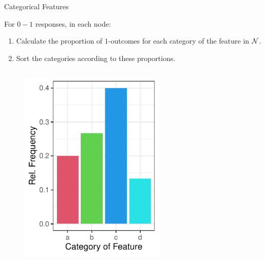 \documentclass[11pt,compress,t,notes=noshow, xcolor=table]{beamer}
\begin{document}
  \begin{frame}[noframenumbering]{Categorical Features}

For $0-1$ responses, in each node:
  \begin{enumerate}
  \item Calculate the proportion of $1$-outcomes for each category of the feature in $\mathcal{N}$.
  \item Sort the categories according to these proportions.
  \end{enumerate}
  \begin{columns}
  \begin{column}{0.33\textwidth}
  \begin{figure}
  \includegraphics[width=0.8\textwidth]{figure/categoryplot-binary1.pdf}
  \end{figure}
  \end{column}
  \begin{column}{0.33\textwidth}
  \begin{figure}

\end{figure}
\end{column}
\end{columns}
\end{frame}
\end{document}
